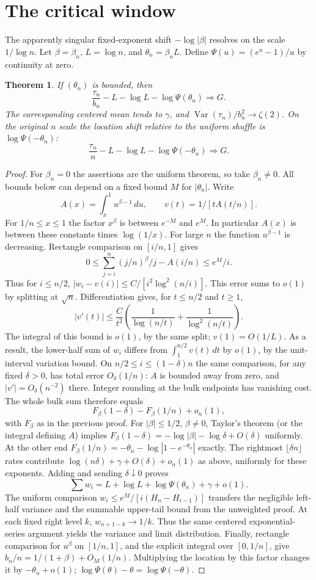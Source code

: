 \documentclass[11pt]{article}
\newtheorem{theorem}{Theorem}
\begin{document}
\section*{The critical window}
The apparently singular fixed-exponent shift $-\log|\beta|$ resolves on the scale $1/\log n$. Let $\beta=\beta_n$, $L=\log n$, and $\theta_n=\beta_nL$. Define $\Psi(u)=(e^u-1)/u$ by continuity at zero.
\begin{theorem}
If $(\theta_n)$ is bounded, then
\[
 \frac{\tau_n}{b_n}-L-\log L-\log\Psi(\theta_n)\Rightarrow G.
\]
The corresponding centered mean tends to $\gamma$, and $\operatorname{Var}(\tau_n)/b_n^2\to\zeta(2)$. On the original $n$ scale the location shift relative to the uniform shuffle is $\log\Psi(-\theta_n)$:
\[
 \frac{\tau_n}{n}-L-\log L-\log\Psi(-\theta_n)\Rightarrow G .
\]
\end{theorem}
\begin{proof}
For $\beta_n=0$ the assertions are the uniform theorem, so take $\beta_n\ne0$. All bounds below can depend on a fixed bound $M$ for $|\theta_n|$. Write
\[
 A(x)=\int_x^1 u^{\beta-1}\,du,\qquad
 v(t)=1/[tA(t/n)].
\]
For $1/n\le x\le1$ the factor $x^\beta$ is between $e^{-M}$ and $e^M$. In particular $A(x)$ is between these constants times $\log(1/x)$. For large $n$ the function $u^{\beta-1}$ is decreasing. Rectangle comparison on $[i/n,1]$ gives
\[
 0\le \sum_{j=i}^n (j/n)^\beta/j-A(i/n)\le e^M/i.
\]
Thus for $i\le n/2$,
$
 |w_i-v(i)|\le C/[i^2\log^2(n/i)].
$
This error sums to $o(1)$ by splitting at $\sqrt n$. Differentiation gives, for $t\le n/2$ and $t\ge1$,
\[
 |v'(t)|\le \frac{C}{t^2}\left(\frac1{\log(n/t)}+
                             \frac1{\log^2(n/t)}\right).
\]
The integral of this bound is $o(1)$, by the same split; $v(1)=O(1/L)$. As a result, the lower-half sum of $w_i$ differs from $\int_1^{n/2}v(t)\,dt$ by $o(1)$, by the unit-interval variation bound. On $n/2\le i\le(1-\delta)n$ the same comparison, for any fixed $\delta>0$, has total error $O_\delta(1/n)$: $A$ is bounded away from zero, and $|v'|=O_\delta(n^{-2})$ there. Integer rounding at the bulk endpoints has vanishing cost. The whole bulk sum therefore equals
\[
 F_\beta(1-\delta)-F_\beta(1/n)+o_n(1),
\]
with $F_\beta$ as in the previous proof. For $|\beta|\le1/2$, $\beta\ne0$, Taylor's theorem (or the integral defining $A$) implies
$F_\beta(1-\delta)=-\log|\beta|-\log\delta+O(\delta)$ uniformly. At the other end $F_\beta(1/n)=-\theta_n-\log|1-e^{-\theta_n}|$ exactly. The rightmost $\lfloor\delta n\rfloor$ rates contribute $\log(n\delta)+\gamma+O(\delta)+o_n(1)$ as above, uniformly for these exponents. Adding and sending $\delta\downarrow0$ proves
\[
 \sum w_i=L+\log L+\log\Psi(\theta_n)+\gamma+o(1).
\]
The uniform comparison $w_i\le e^M/[i(H_n-H_{i-1})]$ transfers the negligible left-half variance and the summable upper-tail bound from the unweighted proof. At each fixed right level $k$, $w_{n+1-k}\to1/k$. Thus the same centered exponential-series argument yields the variance and limit distribution. Finally, rectangle comparison for $u^\beta$ on $[1/n,1]$, and the explicit integral over $[0,1/n]$, give
$b_n/n=1/(1+\beta)+O_M(1/n)$. Multiplying the location by this factor changes it by $-\theta_n+o(1)$; $\log\Psi(\theta)-\theta=\log\Psi(-\theta)$.
\end{proof}
\end{document}
